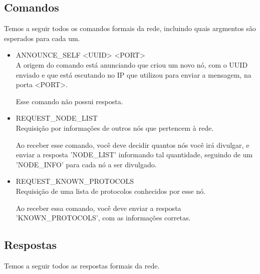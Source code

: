     \subsection{Comandos}
      Temos a seguir todos os comandos formais da rede, incluindo quais argmentos são esperados
      para cada um.
        
      \begin{itemize}
        \item ANNOUNCE\_SELF <UUID> <PORT> \\
          A origem do comando está anunciando que criou um novo nó, com o UUID enviado e que está
          escutando no IP que utilizou para enviar a mensagem, na porta <PORT>.
          
          Esse comando não possui resposta.
      
        \item REQUEST\_NODE\_LIST \\
          Requisição por informações de outros nós que pertencem à rede.
          
          Ao receber esse comando, você deve decidir quantos nós você irá divulgar, e enviar a
          resposta 'NODE\_LIST' informando tal quantidade, seguindo de um 'NODE\_INFO' para cada
          nó a ser divulgado.
          
        \item REQUEST\_KNOWN\_PROTOCOLS \\
          Requisição de uma lista de protocolos conhecidos por esse nó.
          
          Ao receber essa comando, você deve enviar a resposta 'KNOWN\_PROTOCOLS', com as
          informações corretas.
          
      \end{itemize}
      
    \subsection{Respostas}
      Temos a seguir todos as respostas formais da rede.
      

